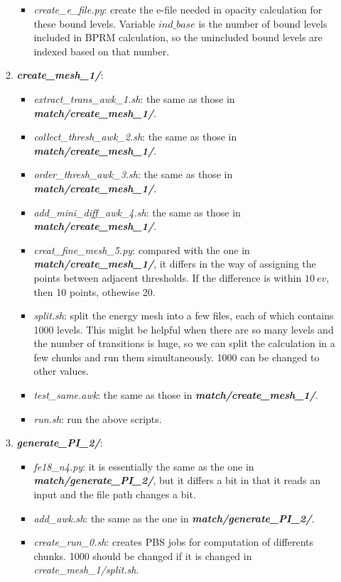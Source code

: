 \begin{enumerate}
\begin{enumerate}
\begin{itemize}
					\item \textit{create\_e\_file.py}: create the e-file needed in opacity calculation for these bound levels. Variable $ind\_base$ is the number of bound levels included in BPRM calculation, so the unincluded bound levels are indexed based on that number.
				\end{itemize}
			\item \textbf{\textit{create\_mesh\_1/}}: 
				\begin{itemize}
					\item \textit{extract\_trans\_awk\_1.sh}: the same as those in \textbf{\textit{match/create\_mesh\_1/}}.
					\item \textit{collect\_thresh\_awk\_2.sh}: the same as those in \textbf{\textit{match/create\_mesh\_1/}}.
					\item \textit{order\_thresh\_awk\_3.sh}: the same as those in \textbf{\textit{match/create\_mesh\_1/}}.
					\item \textit{add\_mini\_diff\_awk\_4.sh}: the same as those in \textbf{\textit{match/create\_mesh\_1/}}.	
					\item \textit{creat\_fine\_mesh\_5.py}: compared with the one in \textbf{\textit{match/create\_mesh\_1/}}, it differs in the way of assigning the points between adjacent thresholds. If the difference is within $10~ev$, then 10 points, othewise 20.
					\item \textit{split.sh}: split the energy mesh into a few files, each of which contains 1000 levels. This might be helpful when there are so many levels and the number of transitions is huge, so we can split the calculation in a few chunks and run them simultaneously. 1000 can be changed to other values.
					\item \textit{test\_same.awk}: the same as those in \textbf{\textit{match/create\_mesh\_1/}}.
					\item \textit{run.sh}: run the above scripts.	
				\end{itemize}
			\item \textbf{\textit{generate\_PI\_2/}}:
				\begin{itemize}
					\item \textit{fe18\_n4.py}: it is essentially the same as the one in \textbf{\textit{match/generate\_PI\_2/}}, but it differs a bit in that it reads an input and the file path changes a bit.
					\item \textit{add\_awk.sh}: the same as the one in \textbf{\textit{match/generate\_PI\_2/}}.
					\item \textit{create\_run\_0.sh}: creates PBS jobs for computation of differents chunks. 1000 should be changed if it is changed in \textit{create\_mesh\_1/split.sh}.

\end{itemize}
\end{enumerate}
\end{enumerate}
